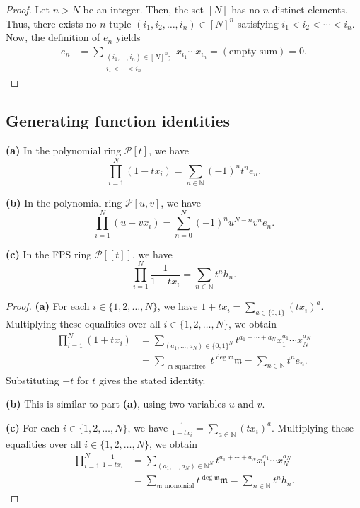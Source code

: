 \begin{proof}
\leanok
Let $n > N$ be an integer. Then, the set $[N]$ has no $n$
distinct elements. Thus, there exists no $n$-tuple $(i_1, i_2, \ldots, i_n)
\in [N]^n$ satisfying $i_1 < i_2 < \cdots < i_n$.
Now, the definition of $e_n$ yields
\begin{align*}
e_n &= \sum_{\substack{(i_1, \ldots, i_n) \in [N]^n; \\ i_1 < \cdots < i_n}}
x_{i_1} \cdots x_{i_n}
= (\text{empty sum}) = 0.
\end{align*}
\end{proof}

\subsection{Generating function identities}

\begin{proposition}
\label{prop.sf.e-h-FPS}
\leantarget
\leanok
\textbf{(a)} In the polynomial ring $\mathcal{P}[t]$, we have
\[
\prod_{i=1}^{N} (1 - t x_i) = \sum_{n \in \mathbb{N}} (-1)^n t^n e_n.
\]

\textbf{(b)} In the polynomial ring $\mathcal{P}[u,v]$, we have
\[
\prod_{i=1}^{N} (u - v x_i) = \sum_{n=0}^{N} (-1)^n u^{N-n} v^n e_n.
\]

\textbf{(c)} In the FPS ring $\mathcal{P}[[t]]$, we have
\[
\prod_{i=1}^{N} \frac{1}{1 - t x_i} = \sum_{n \in \mathbb{N}} t^n h_n.
\]
\end{proposition}

\begin{proof}
\textbf{(a)} For each $i \in \{1, 2, \ldots, N\}$, we have
$1 + t x_i = \sum_{a \in \{0,1\}} (t x_i)^a$.
Multiplying these equalities over all $i \in \{1, 2, \ldots, N\}$, we obtain
\begin{align*}
\prod_{i=1}^{N} (1 + t x_i)
&= \sum_{(a_1, \ldots, a_N) \in \{0,1\}^N} t^{a_1 + \cdots + a_N} x_1^{a_1} \cdots x_N^{a_N} \\
&= \sum_{\substack{\mathfrak{m} \text{ squarefree}}} t^{\deg \mathfrak{m}} \mathfrak{m}
= \sum_{n \in \mathbb{N}} t^n e_n.
\end{align*}
Substituting $-t$ for $t$ gives the stated identity. \medskip

\textbf{(b)} This is similar to part \textbf{(a)}, using two variables $u$ and $v$.  \medskip

\textbf{(c)} For each $i \in \{1, 2, \ldots, N\}$, we have
$\frac{1}{1 - t x_i} = \sum_{a \in \mathbb{N}} (t x_i)^a$.
Multiplying these equalities over all $i \in \{1, 2, \ldots, N\}$, we obtain
\begin{align*}
\prod_{i=1}^{N} \frac{1}{1 - t x_i}
&= \sum_{(a_1, \ldots, a_N) \in \mathbb{N}^N} t^{a_1 + \cdots + a_N} x_1^{a_1} \cdots x_N^{a_N} \\
&= \sum_{\mathfrak{m} \text{ monomial}} t^{\deg \mathfrak{m}} \mathfrak{m}
= \sum_{n \in \mathbb{N}} t^n h_n.
\end{align*}
\end{proof}

